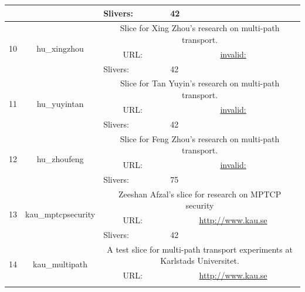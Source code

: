 \begin{small}
\begin{center}
\begin{longtable}{|c|c|c|c|}
  &  & \multicolumn{1}{|l|}{Slivers:} & \multicolumn{1}{|l|}{42} \\ \hline
 \multirow{3}{*}{10} & \multirow{3}{*}{\index{hu\_xingzhou}\index{Slice!hu\_xingzhou}hu\_xingzhou} & \multicolumn{2}{|p{30em}|}{Slice for Xing Zhou's research on multi-path transport.} \\* \cline{3-3}\cline{4-4}
  &  & \multicolumn{1}{|p{5em}|}{URL:} & \multicolumn{1}{|p{22.5em}|}{\url{invalid:}} \\* \cline{3-3}\cline{4-4}
  &  & \multicolumn{1}{|l|}{Slivers:} & \multicolumn{1}{|l|}{42} \\ \hline
 \multirow{3}{*}{11} & \multirow{3}{*}{\index{hu\_yuyintan}\index{Slice!hu\_yuyintan}hu\_yuyintan} & \multicolumn{2}{|p{30em}|}{Slice for Tan Yuyin's research on multi-path transport.} \\* \cline{3-3}\cline{4-4}
  &  & \multicolumn{1}{|p{5em}|}{URL:} & \multicolumn{1}{|p{22.5em}|}{\url{invalid:}} \\* \cline{3-3}\cline{4-4}
  &  & \multicolumn{1}{|l|}{Slivers:} & \multicolumn{1}{|l|}{42} \\ \hline
 \multirow{3}{*}{12} & \multirow{3}{*}{\index{hu\_zhoufeng}\index{Slice!hu\_zhoufeng}hu\_zhoufeng} & \multicolumn{2}{|p{30em}|}{Slice for Feng Zhou's research on multi-path transport.} \\* \cline{3-3}\cline{4-4}
  &  & \multicolumn{1}{|p{5em}|}{URL:} & \multicolumn{1}{|p{22.5em}|}{\url{invalid:}} \\* \cline{3-3}\cline{4-4}
  &  & \multicolumn{1}{|l|}{Slivers:} & \multicolumn{1}{|l|}{75} \\ \hline
 \multirow{3}{*}{13} & \multirow{3}{*}{\index{kau\_mptcpsecurity}\index{Slice!kau\_mptcpsecurity}kau\_mptcpsecurity} & \multicolumn{2}{|p{30em}|}{Zeeshan Afzal's slice for research on MPTCP security} \\* \cline{3-3}\cline{4-4}
  &  & \multicolumn{1}{|p{5em}|}{URL:} & \multicolumn{1}{|p{22.5em}|}{\url{http://www.kau.se}} \\* \cline{3-3}\cline{4-4}
  &  & \multicolumn{1}{|l|}{Slivers:} & \multicolumn{1}{|l|}{42} \\ \hline
 \multirow{3}{*}{14} & \multirow{3}{*}{\index{kau\_multipath}\index{Slice!kau\_multipath}kau\_multipath} & \multicolumn{2}{|p{30em}|}{A test slice for multi-path transport experiments at Karlstads Universitet.} \\* \cline{3-3}\cline{4-4}
  &  & \multicolumn{1}{|p{5em}|}{URL:} & \multicolumn{1}{|p{22.5em}|}{\url{http://www.kau.se}} \\* \cline{3-3}\cline{4-4}

\end{longtable}
\end{center}
\end{small}
